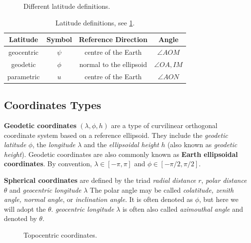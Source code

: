 \documentclass{article}
\begin{document}
  \begin{figure}
    \centering
      
      \caption{Different latitude definitions.}
      \label{fig:latitude-definitions}
  \end{figure}
  \begin{table}[h!]
    \centering
    \begin{tabular}{| c | c | c | c|}
      \hline
      \textbf{Latitude} & \textbf{Symbol} & \textbf{Reference Direction} & \textbf{Angle} \\
      \hline
      geocentric & $\psi$ & centre of the Earth & $\angle{AOM}$ \\
      geodetic   & $\phi$ & normal to the ellipsoid & $\angle{OA,IM}$ \\
      parametric & $u$    & centre of the Earth & $\angle{AON}$ \\
      \hline
    \end{tabular}
    \caption{Latitude definitions, see \ref{fig:latitude-definitions}.}
    \label{table:latitude-definitions}
\end{table}
  
  \subsection{Coordinates Types}
  \label{ssec:coordinates-types}
  \textbf{Geodetic coordinates} $(\lambda, \phi, h)$ are a type of curvilinear 
  orthogonal coordinate system based on a reference ellipsoid. They include the 
  \emph{geodetic latitude} $\phi$, the \emph{longitude} $\lambda$ and the 
  \emph{ellipsoidal height} $h$ (also known as \emph{geodetic height}). Geodetic 
  coordinates are also commonly known as \textbf{Earth ellipsoidal coordinates}. 
  By convention, $\lambda \in \left[-\pi, \pi \right]$ and 
  $\phi \in \left[-\pi/2, \pi/2 \right]$.

  \textbf{Spherical coordinates} are defined by the triad \emph{radial distance} 
  $r$, \emph{polar distance} $\theta$ and \emph{geocentric longitude} $\lambda$ 
  The polar angle may be called \emph{colatitude, zenith angle, normal angle}, or 
  \emph{inclination angle}. It is often denoted as $\phi$, but here we will adopt 
  the $\theta$. \emph{geocentric longitude} $\lambda$ is often also called \emph{azimouthal angle} 
  and denoted by $\theta$.
  \begin{figure}
    \centering
      
      \caption{Topocentric coordinates.}
      \label{fig:topocentric-crd}
  \end{figure}
\end{document}
